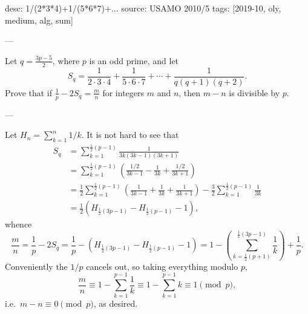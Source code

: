 desc: 1/(2*3*4)+1/(5*6*7)+...
source: USAMO 2010/5
tags: [2019-10, oly, medium, alg, sum]

---

Let $q=\frac{3p-5}2$, where $p$ is an odd prime, and let \[S_q=\frac1{2\cdot3\cdot4}+\frac1{5\cdot6\cdot7}+\cdots+\frac1{q(q+1)(q+2)}.\]
Prove that if $\frac1p-2S_q=\frac mn$ for integers $m$ and $n$, then $m-n$ is divisible by $p$.

---

Let $H_n=\sum_{k=1}^n1/k$. It is not hard to see that
\begin{align*}
    S_q&=\sum_{k=1}^{\frac12(p-1)}\frac1{3k(3k-1)(3k+1)}\\
        &=\sum_{k=1}^{\frac12(p-1)}\left(\frac{1/2}{3k-1}-\frac1{3k}+\frac{1/2}{3k+1}\right)\\
        &=\frac12\sum_{k=1}^{\frac12(p-1)}\left(\frac1{3k-1}+\frac1{3k}+\frac1{3k+1}\right)-\frac32\sum_{k=1}^{\frac12(p-1)}\frac1{3k}\\
        &=\frac12\left(H_{\frac12(3p-1)}-H_{\frac12(p-1)}-1\right),
\end{align*}
whence \[\frac mn=\frac1p-2S_q=\frac1p-\left(H_{\frac12(3p-1)}-H_{\frac12(p-1)}-1\right)=1-\left(\sum_{k=\frac12(p+1)}^{\frac12(3p-1)}\frac1k\right)+\frac1p.\]
Conveniently the $1/p$ cancels out, so taking everything modulo $p$, \[\frac mn\equiv 1-\sum_{k=1}^{p-1}\frac1k\equiv 1-\sum_{k=1}^{p-1}k\equiv 1\pmod p,\]
i.e.\ $m-n\equiv 0\pmod p$, as desired.
